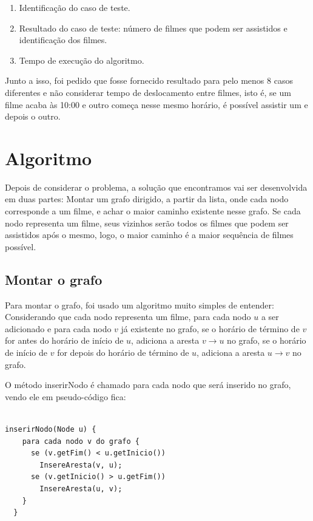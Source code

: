 \documentclass[12pt]{article}
\begin{document}
\begin{enumerate}

\item Identificação do caso de teste.

\item Resultado do caso de teste: número de filmes que podem ser assistidos e identificação dos filmes.

\item Tempo de execução do algoritmo.

\end{enumerate}

Junto a isso, foi pedido que fosse fornecido resultado para pelo menos 8 casos
diferentes e não considerar tempo de deslocamento entre filmes, isto é, se um
filme acaba às 10:00 e outro começa nesse mesmo horário, é possível assistir um
e depois o outro.

\section{Algoritmo}

Depois de considerar o problema, a solução que encontramos vai ser desenvolvida
em duas partes: Montar um grafo dirigido, a partir da lista, onde cada nodo
corresponde a um filme, e achar o maior caminho existente nesse grafo. Se cada
nodo representa um filme, seus vizinhos serão todos os filmes que podem ser
assistidos após o mesmo, logo, o maior caminho é a maior sequência de filmes
possível.

\subsection{Montar o grafo}

Para montar o grafo, foi usado um algoritmo muito simples de entender:
Considerando que cada nodo representa um filme, para cada nodo $u$ a ser
adicionado e para cada nodo $v$ já existente no grafo, se o horário de término
de $v$ for antes do horário de início de $u$, adiciona a aresta $v \rightarrow
u$ no grafo, se o horário de início de $v$ for depois do horário de término de
$u$, adiciona a aresta $u \rightarrow v$ no grafo.

O método inserirNodo é chamado para cada nodo que será inserido no grafo, vendo
ele em pseudo-código fica:

\begin{lstlisting}

inserirNodo(Node u) {
    para cada nodo v do grafo {
      se (v.getFim() < u.getInicio())
        InsereAresta(v, u);
      se (v.getInicio() > u.getFim())
        InsereAresta(u, v);
    }
  }

\end{lstlisting}
\end{document}
